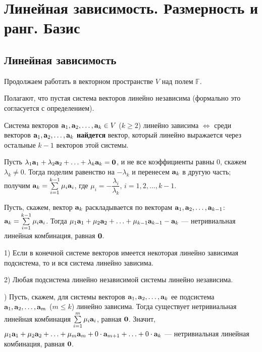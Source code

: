 \section{Линейная зависимость. Размерность и ранг. Базис}

\subsection{Линейная зависимость}


Продолжаем работать в векторном пространстве $V$ над полем $\mathbb{F}$.



Полагают, что пустая система векторов линейно независима
(формально это согласуется с определением).


\begin{predl}\label{p7_2_1}
Система векторов $\mathbf{a}_1, \mathbf{a}_2, \ldots, \mathbf{a}_k \in V$ ($k\geq 2$)
линейно зависима $\Leftrightarrow$ 
среди векторов $\mathbf{a}_1, \mathbf{a}_2, \ldots, \mathbf{a}_k$ {\bf найдется} вектор, который
линейно выражается через остальные $k-1$ векторов этой системы.
\end{predl}
\dok \dokright Пусть $\lambda_1 \mathbf{a}_1 +\lambda_2 \mathbf{a}_2+ \ldots + \lambda_k \mathbf{a}_k
=\mathbf{0}$, и не все коэффициенты равны $0$,
скажем $\lambda_k \neq 0$. Тогда поделим равенство на $-\lambda_k$
и перенесем $\mathbf{a}_k$ в другую часть; получим
$\mathbf{a}_k = \sum\limits_{i=1}^{k-1}\mu_i \mathbf{a}_i$, где
$\mu_i=-\dfrac{\lambda_i}{\lambda_k}$, $i=1, 2, \ldots , k-1$.

\dokleft Пусть, скажем, вектор $\mathbf{a}_k$ раскладывается по векторам
$\mathbf{a}_1, \mathbf{a}_2, \ldots, \mathbf{a}_{k-1} $:
$\mathbf{a}_k = \sum\limits_{i=1}^{k-1}\mu_i \mathbf{a}_i$. Тогда
$\mu_1 \mathbf{a}_1 +\mu_2 \mathbf{a}_2+ \ldots + \mu_{k-1} \mathbf{a}_{k-1}-\mathbf{a}_k$ --- нетривиальная
линейная комбинация, равная $\mathbf{0}$.
\edok

\begin{predl}\label{p7_2_2}
1) Если в конечной системе векторов
имеется некоторая линейно зависимая подсистема, то и вся система линейно зависима.

2) Любая подсистема линейно независимой системы линейно независима.
\end{predl}
) Пусть, скажем, для системы векторов $\mathbf{a}_1, \mathbf{a}_2, \ldots, \mathbf{a}_k$
ее подсистема $\mathbf{a}_1, \mathbf{a}_2, \ldots, \mathbf{a}_m$ ($m\leq k$)
линейно зависима. Тогда существует нетривиальная линейная комбинация
$\sum\limits_{i=1}^{m}\mu_i \mathbf{a}_i$, равная $\mathbf{0}$.
Значит, 
$\mu_1 \mathbf{a}_1 +\mu_2 \mathbf{a}_2+ \ldots + \mu_{m} \mathbf{a}_{m} +
0\cdot \mathbf{a}_{m+1} + \ldots + 0\cdot \mathbf{a}_k$ --- нетривиальная линейная комбинация, равная $\mathbf{0}$.

